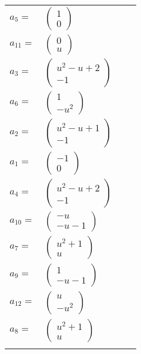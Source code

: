 \documentclass[1p]{elsarticle_modified}
\theoremstyle{definition}
\begin{document}
\begin{tabular}{m{7pt} m{180pt} m{7pt} m{180pt} }
\flushright $a_{5}=$&$\begin{pmatrix}1\\0\end{pmatrix}$ \\
\flushright $a_{11}=$&$\begin{pmatrix}0\\u\end{pmatrix}$ \\
\flushright $a_{3}=$&$\begin{pmatrix}u^2- u+2\\-1\end{pmatrix}$ \\
\flushright $a_{6}=$&$\begin{pmatrix}1\\- u^2\end{pmatrix}$ \\
\flushright $a_{2}=$&$\begin{pmatrix}u^2- u+1\\-1\end{pmatrix}$ \\
\flushright $a_{1}=$&$\begin{pmatrix}-1\\0\end{pmatrix}$ \\
\flushright $a_{4}=$&$\begin{pmatrix}u^2- u+2\\-1\end{pmatrix}$ \\
\flushright $a_{10}=$&$\begin{pmatrix}- u\\- u-1\end{pmatrix}$ \\
\flushright $a_{7}=$&$\begin{pmatrix}u^2+1\\u\end{pmatrix}$ \\
\flushright $a_{9}=$&$\begin{pmatrix}1\\- u-1\end{pmatrix}$ \\
\flushright $a_{12}=$&$\begin{pmatrix}u\\- u^2\end{pmatrix}$ \\
\flushright $a_{8}=$&$\begin{pmatrix}u^2+1\\u\end{pmatrix}$\\&\end{tabular}
\end{document}
